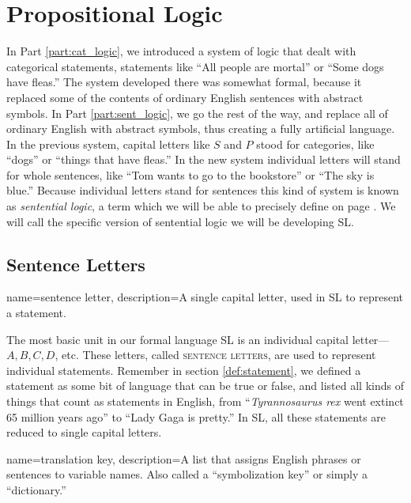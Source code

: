 \chapter{Propositional Logic}
\label{ch:SL}


In Part \ref{part:cat_logic}, we introduced a system of logic that dealt with categorical statements, statements like ``All people are mortal'' or ``Some dogs have  fleas.'' The system developed there was somewhat formal, because it replaced some of the contents of ordinary English sentences with abstract symbols. In Part \ref{part:sent_logic}, we go the rest of the way, and replace all of ordinary English with abstract symbols, thus creating a fully artificial language. In the previous system, capital letters like $S$ and $P$ stood for categories, like ``dogs'' or ``things that have fleas.'' In the new system individual letters will stand for whole sentences, like ``Tom wants to go to the bookstore'' or ``The sky is blue.'' Because individual letters stand for sentences this kind of system is known as \textit{sentential logic}, a term which we will be able to precisely define on page \pageref{def:sentential_logic}. We will call the specific version of sentential logic we will be developing SL.

\section{Sentence Letters}


{
name=sentence letter,
description={A single capital letter, used in SL to represent a statement.}
}

The most basic unit in our formal language SL is an individual capital letter---$A, B, C, D$, etc. These letters, called \textsc{\glspl{sentence letter}}, \label{def:sentence_letter} are used to represent individual statements. Remember in section \ref{def:statement}, we defined a statement as some bit of language that can be true or false, and listed all kinds of things that count as statements in English, from ``\emph{Tyrannosaurus rex} went extinct 65 million years ago'' to ``Lady Gaga is pretty.'' In SL, all these statements are reduced to single capital letters.

{
name=translation key,
description={A list that assigns English phrases or sentences to variable names. Also called a ``symbolization key''  or simply a ``dictionary.''}
}

